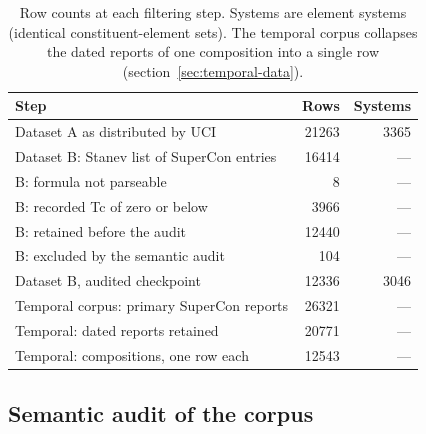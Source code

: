 \documentclass{iopjournal}
\begin{document}
\begin{table}[t]
\caption{\label{tab:flow}Row counts at each filtering step. Systems are element systems (identical constituent-element sets). The temporal corpus collapses the dated reports of one composition into a single row (section~\ref{sec:temporal-data}).}
\centering\small
\begin{tabular}{@{}lrr@{}}
\toprule
Step & Rows & Systems \\
\midrule
Dataset A as distributed by UCI & \num{21263} & \num{3365} \\
\midrule
Dataset B: Stanev list of SuperCon entries & \num{16414} & {---} \\
B: formula not parseable & \num{8} & {---} \\
B: recorded Tc of zero or below & \num{3966} & {---} \\
B: retained before the audit & \num{12440} & {---} \\
B: excluded by the semantic audit & \num{104} & {---} \\
Dataset B, audited checkpoint & \num{12336} & \num{3046} \\
\midrule
Temporal corpus: primary SuperCon reports & \num{26321} & {---} \\
Temporal: dated reports retained & \num{20771} & {---} \\
Temporal: compositions, one row each & \num{12543} & {---} \\
\bottomrule
\end{tabular}
\end{table}

\subsection{Semantic audit of the corpus}
\label{sec:audit}
\end{document}
